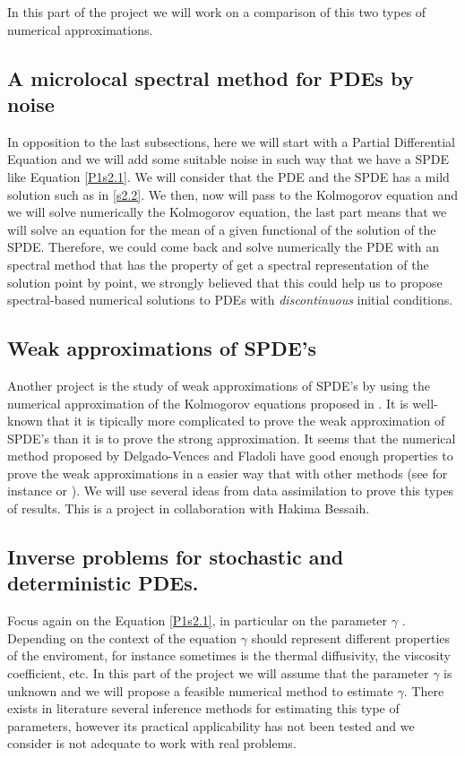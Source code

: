 \documentclass{article}
\numberwithin{equation}{section}
\begin{document}
In this part of the project we will work on a comparison of this two types of numerical approximations.

\subsection{A microlocal spectral method for PDEs by noise}\label{microlocal}


In opposition to the last subsections, here we will start with a Partial Differential Equation and we will add some suitable noise in such way that we have a SPDE like Equation \eqref{P1s2.1}. We will consider that the PDE and the SPDE has a mild solution such as in \eqref{s2.2}. We then, now will pass to the Kolmogorov equation and we will solve numerically the Kolmogorov equation, the last part means that we will solve an equation for the mean of a given functional of the solution of the SPDE. Therefore, we could come back and solve numerically the PDE with an spectral method that has the property of get a spectral representation of the solution point by point, we strongly believed that this could help us to propose spectral-based numerical solutions to PDEs with {\it discontinuous} initial conditions.

\subsection{ Weak approximations of SPDE's}
Another project is the study of weak approximations of SPDE's by using the numerical approximation of the Kolmogorov equations proposed in \cite{de-fl}. It is well-known that it is tipically more complicated to prove the weak approximation of SPDE's than it is to prove  the strong 
approximation. It seems that the numerical method proposed by Delgado-Vences and Fladoli have good enough properties to prove the weak 
approximations in a easier way that with other methods (see for instance \cite{deb1} or \cite{de-pr}). We will use several ideas from data 
assimilation to prove this types of results. This is a project in collaboration with 
Hakima Bessaih. 


\subsection{Inverse problems for stochastic and deterministic PDEs.}

Focus again on the Equation \eqref{P1s2.1}, in particular on the parameter $\gamma$ . Depending on the context of the equation $\gamma$ should represent different properties of the enviroment, for instance sometimes is the thermal diffusivity, the viscosity coefficient, etc. In this part of the project we will assume that the parameter $\gamma$ is unknown and we will propose a feasible numerical method to estimate $\gamma$. There exists in literature several inference methods for estimating this type of parameters, however its practical applicability has not been tested and we consider is not adequate to work with real problems.
\end{document}
